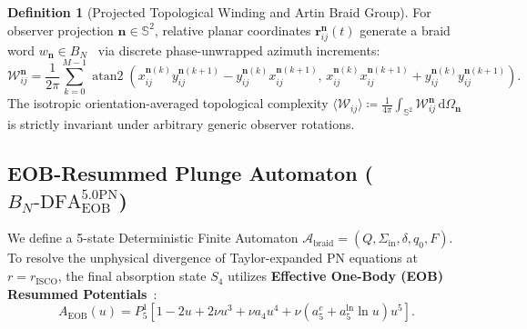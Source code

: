 \documentclass[11pt,a4paper,reqno]{article}
\theoremstyle{plain}
\theoremstyle{definition}
\newtheorem{definition}[theorem]{Definition}
\theoremstyle{remark}
\numberwithin{equation}{section}
\begin{document}
\begin{definition}[Projected Topological Winding and Artin Braid Group]
For observer projection $\mathbf{n} \in \mathbb{S}^2$, relative planar coordinates $\bm{r}_{ij}^{\mathbf{n}}(t)$ generate a braid word $w_{\mathbf{n}} \in B_N$~\cite{Artin1947,Birman1974} via discrete phase-unwrapped azimuth increments:
\begin{equation}
\mathcal{W}_{ij}^{\mathbf{n}} = \frac{1}{2\pi} \sum_{k=0}^{M-1} \operatorname{atan2}\left(x_{ij}^{\mathbf{n}(k)} y_{ij}^{\mathbf{n}(k+1)} - y_{ij}^{\mathbf{n}(k)} x_{ij}^{\mathbf{n}(k+1)}, \, x_{ij}^{\mathbf{n}(k)} x_{ij}^{\mathbf{n}(k+1)} + y_{ij}^{\mathbf{n}(k)} y_{ij}^{\mathbf{n}(k+1)}\right).
\end{equation}
The isotropic orientation-averaged topological complexity $\langle \mathcal{W}_{ij} \rangle \coloneqq \frac{1}{4\pi} \int_{\mathbb{S}^2} \mathcal{W}_{ij}^{\mathbf{n}} \, \mathrm{d}\Omega_{\mathbf{n}}$ is strictly invariant under arbitrary generic observer rotations.
\end{definition}

\subsection{EOB-Resummed Plunge Automaton (\texorpdfstring{$B_N\text{-DFA}_{\mathrm{EOB}}^{5.0\mathrm{PN}}$}{BN-DFA EOB 5.0PN})}
We define a 5-state Deterministic Finite Automaton $\mathcal{A}_{\mathrm{braid}} = ( Q, \Sigma_{\mathrm{in}}, \delta, q_0, F )$. To resolve the unphysical divergence of Taylor-expanded PN equations at $r = r_{\mathrm{ISCO}}$, the final absorption state $S_4$ utilizes \textbf{Effective One-Body (EOB) Resummed Potentials}~\cite{BuonannoDamour1999}:
\begin{equation}
A_{\mathrm{EOB}}(u) = P_5^1\left[ 1 - 2u + 2\nu u^3 + \nu a_4 u^4 + \nu (a_5^c + a_5^{\ln} \ln u) u^5 \right].
\end{equation}
\end{document}
